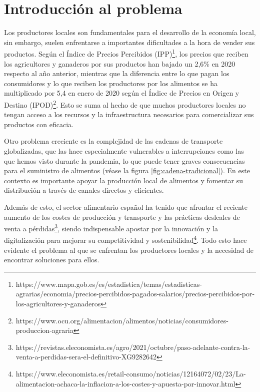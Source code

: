 
\section{Introducción al problema}\label{sec:intro}

Los productores locales son fundamentales para el desarrollo de la economía local, sin embargo, suelen enfrentarse a importantes dificultades a la hora de vender sus productos. Según el Índice de Precios Percibidos (IPP)\footnote{https://www.mapa.gob.es/es/estadistica/temas/estadisticas-agrarias/economia/precios-percibidos-pagados-salarios/precios-percibidos-por-los-agricultores-y-ganaderos}, los precios que reciben los agricultores y ganaderos por sus productos han bajado un 2,6\% en 2020 respecto al año anterior, mientras que la diferencia entre lo que pagan los consumidores y lo que reciben los productores por los alimentos se ha multiplicado por 5,4 en enero de 2020 según el Índice de Precios en Origen y Destino (IPOD)\footnote{https://www.ocu.org/alimentacion/alimentos/noticias/consumidores-produccion-agraria}. Esto se suma al hecho de que muchos productores locales no tengan acceso a los recursos y la infraestructura necesarios para comercializar sus productos con eficacia.

Otro problema creciente es la complejidad de las cadenas de transporte globalizadas, que las hace especialmente vulnerables a interrupciones como las que hemos visto durante la pandemia, lo que puede tener graves consecuencias para el suministro de alimentos (véase la figura \ref{fig:cadena-tradicional}). En este contexto es importante apoyar la producción local de alimentos y fomentar su distribución a través de canales directos y eficientes.

Además de esto, el sector alimentario español ha tenido que afrontar el reciente aumento de los costes de producción y transporte y las prácticas desleales de venta a pérdidas\footnote{https://revistas.eleconomista.es/agro/2021/octubre/paso-adelante-contra-la-venta-a-perdidas-sera-el-definitivo-XG9282642}, siendo indispensable apostar por la innovación y la digitalización para mejorar su competitividad y sostenibilidad\footnote{https://www.eleconomista.es/retail-consumo/noticias/12164072/02/23/La-alimentacion-achaca-la-inflacion-a-los-costes-y-apuesta-por-innovar.html}. Todo esto hace evidente el problema al que se enfrentan los productores locales y la necesidad de encontrar soluciones para ellos.


